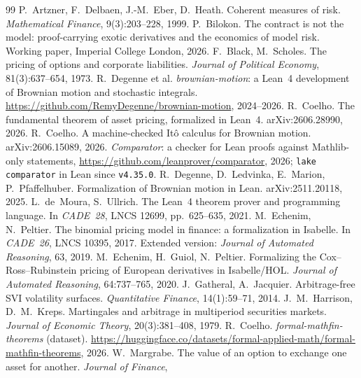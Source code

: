 \documentclass[11pt]{article}
\begin{document}
\begin{thebibliography}{99}
\small
{} P.~Artzner, F.~Delbaen, J.-M.~Eber, D.~Heath. Coherent measures of risk. \emph{Mathematical Finance},
  9(3):203--228, 1999.
 P.~Bilokon. The contract is not the model: proof-carrying exotic derivatives and the economics of model risk.
  Working paper, Imperial College London, 2026.
 F.~Black, M.~Scholes. The pricing of options and corporate liabilities. \emph{Journal of Political
  Economy}, 81(3):637--654, 1973.
 R.~Degenne et al. \emph{brownian-motion}: a Lean~4 development of Brownian motion and stochastic
  integrals. \url{https://github.com/RemyDegenne/brownian-motion}, 2024--2026.
 R.~Coelho. The fundamental theorem of asset pricing, formalized in Lean~4. arXiv:2606.28990, 2026.
 R.~Coelho. A machine-checked It\^o calculus for Brownian motion. arXiv:2606.15089, 2026.
 \emph{Comparator}: a checker for Lean proofs against Mathlib-only statements,
  \url{https://github.com/leanprover/comparator}, 2026; \texttt{lake comparator} in Lean since \texttt{v4.35.0}.
 R.~Degenne, D.~Ledvinka, E.~Marion, P.~Pfaffelhuber. Formalization of Brownian motion in Lean.
  arXiv:2511.20118, 2025.
 L.~de~Moura, S.~Ullrich. The Lean~4 theorem prover and programming language. In \emph{CADE~28},
  LNCS 12699, pp.~625--635, 2021.
 M.~Echenim, N.~Peltier. The binomial pricing model in finance: a formalization in Isabelle. In
  \emph{CADE~26}, LNCS 10395, 2017. Extended version: \emph{Journal of Automated Reasoning}, 63, 2019.
 M.~Echenim, H.~Guiol, N.~Peltier. Formalizing the Cox--Ross--Rubinstein pricing of European
  derivatives in Isabelle/HOL. \emph{Journal of Automated Reasoning}, 64:737--765, 2020.
 J.~Gatheral, A.~Jacquier. Arbitrage-free SVI volatility surfaces. \emph{Quantitative Finance},
  14(1):59--71, 2014.
 J.~M.~Harrison, D.~M.~Kreps. Martingales and arbitrage in multiperiod securities markets.
  \emph{Journal of Economic Theory}, 20(3):381--408, 1979.
 R.~Coelho. \emph{formal-mathfin-theorems} (dataset).
  \url{https://huggingface.co/datasets/formal-applied-math/formal-mathfin-theorems}, 2026.
 W.~Margrabe. The value of an option to exchange one asset for another. \emph{Journal of Finance},

\end{thebibliography}
\end{document}
